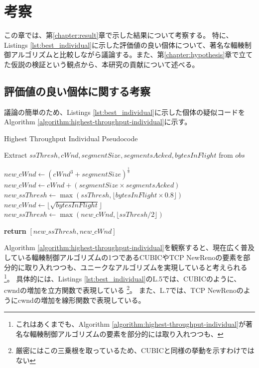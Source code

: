 \documentclass[a4paper,11pt]{jreport}
\newcommand{\chapref}[1]{第\ref{#1}章}
\newcommand{\algorithmref}[1]{Algorithm \ref{#1}}
\begin{document}
\newpage

\chapter{考察}
\label{chapter:discussion}
この章では、\chapref{chapter:result}で示した結果について考察する。
特に、Listings \ref{lst:best_individual}に示した評価値の良い個体について、著名な輻輳制御アルゴリズムと比較しながら議論する。また、\chapref{chapter:hypothesis}で立てた仮説の検証という観点から、本研究の貢献について述べる。

\section{評価値の良い個体に関する考察}
議論の簡単のため、Listings \ref{lst:best_individual}に示した個体の疑似コードを\algorithmref{algorithm:highest-throughput-individual}に示す。
\begin{algorithm}
  \caption{Highest Throughput Individual Pseudocode}
  \label{algorithm:highest-throughput-individual}
  \begin{algorithmic}[1]

      \State Extract $ssThresh, cWnd, segmentSize, segmentsAcked, bytesInFlight$ from $obs$

              \State $new\_cWnd \gets (cWnd^3 + segmentSize)^{\frac{1}{3}}$
          \Else
              \State $new\_cWnd \gets cWnd + (segmentSize \times segmentsAcked)$
          \EndIf
          \State $new\_ssThresh \gets \max(ssThresh, \lfloor bytesInFlight \times 0.8 \rfloor)$
      \Else
          \State $new\_cWnd \gets \lfloor \sqrt{bytesInFlight} \rfloor$
          \State $new\_ssThresh \gets \max(new\_cWnd, \lfloor ssThresh / 2 \rfloor)$
      \EndIf

      \State \textbf{return} $[new\_ssThresh, new\_cWnd]$
  \EndProcedure

  \end{algorithmic}
\end{algorithm}
\algorithmref{algorithm:highest-throughput-individual}を観察すると、現在広く普及している輻輳制御アルゴリズムの1つであるCUBIC\cite{cubic}やTCP NewReno\cite{floyd2004newreno,henderson2012newreno}の要素を部分的に取り入れつつも、ユニークなアルゴリズムを実現していると考えられる
\footnote{これはあくまでも、\algorithmref{algorithm:highest-throughput-individual}が著名な輻輳制御アルゴリズムの要素を部分的には取り入れつつも、}。
具体的には、Listings \ref{lst:best_individual}のL.5では、CUBICのように、cwndの増加を立方関数で表現している
\footnote{厳密にはこの三乗根を取っているため、CUBICと同様の挙動を示すわけではない}。
また、L.7では、TCP NewRenoのようにcwndの増加を線形関数で表現している。
\end{document}
